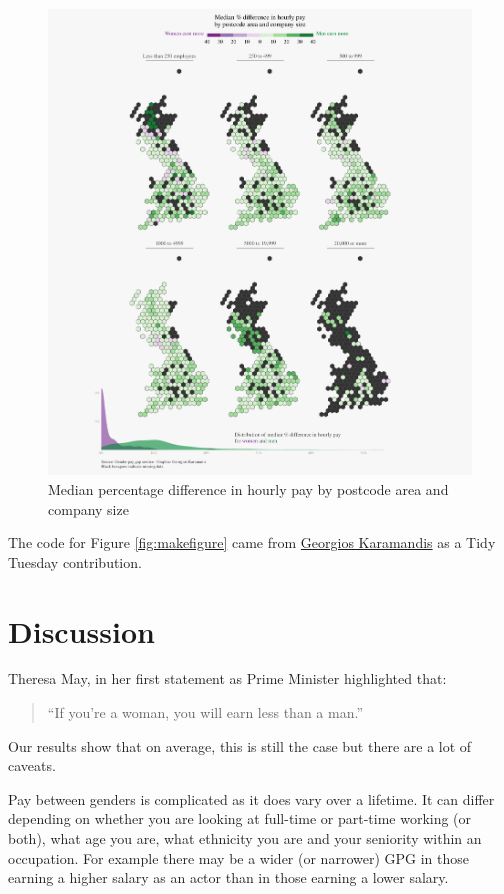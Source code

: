 \documentclass[
  11pt,
]{article}
\begin{document}
\begin{figure}[p]

{\centering \includegraphics[width=0.8\linewidth]{gender_pay_gap_files/figure-latex/geomaps-1} 

}

\caption{\label{fig:makefigure} Median percentage difference in hourly pay by postcode area and company size}\label{fig:geomaps}
\end{figure}

The code for Figure \ref{fig:makefigure} came from
\href{https://github.com/gkaramanis/tidytuesday/tree/master/2022/2022-week_26}{Georgios
Karamandis} as a Tidy Tuesday contribution.

\newpage

\hypertarget{discussion}{%
\section{Discussion}\label{discussion}}

Theresa May, in her first statement as Prime Minister highlighted that:

\begin{quote}
``If you're a woman, you will earn less than a man.''
\end{quote}

Our results show that on average, this is still the case but there are a
lot of caveats.

Pay between genders is complicated as it does vary over a lifetime. It
can differ depending on whether you are looking at full-time or
part-time working (or both), what age you are, what ethnicity you are
and your seniority within an occupation. For example there may be a
wider (or narrower) GPG in those earning a higher salary as an actor
than in those earning a lower salary.
\end{document}
